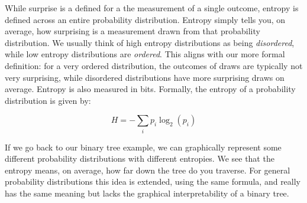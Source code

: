 \documentclass{article}
\begin{document}
While surprise is a defined for a the measurement of a single outcome, entropy is defined across an entire probability distribution. Entropy simply tells you, on average, how surprising is a measurement drawn from that probability distribution. We usually think of high entropy distributions as being \textit{disordered}, while low entropy distributions are \textit{ordered}. This aligns with our more formal definition: for a very ordered distribution, the outcomes of draws are typically not very surprising, while disordered distributions have more surprising draws on average. Entropy is also measured in bits. Formally, the entropy of a probability distribution is given by:

\begin{equation*}
	H = -\sum_i p_i \log_2(p_i)
\end{equation*}

If we go back to our binary tree example, we can graphically represent some different probability distributions with different entropies. We see that the entropy means, on average, how far down the tree do you traverse. For general probability distributions this idea is extended, using the same formula, and really has the same meaning but lacks the graphical interpretability of a binary tree.
\end{document}
